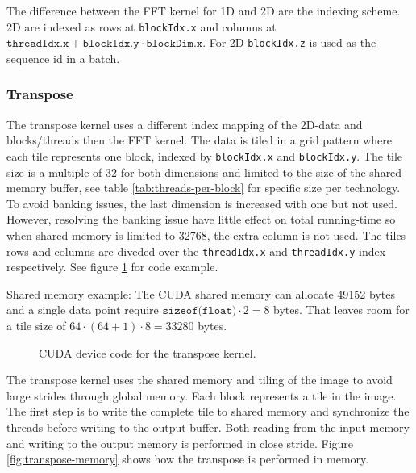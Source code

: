 The difference between the FFT kernel for 1D and 2D are the indexing scheme. 2D are indexed as rows at \texttt{blockIdx.x} and columns at $\texttt{threadIdx.x} + \texttt{blockIdx.y} \cdot \texttt{blockDim.x}$. For 2D \texttt{blockIdx.z} is used as the sequence id in a batch.

\subsubsection{Transpose}

The transpose kernel uses a different index mapping of the 2D-data and blocks/threads then the FFT kernel. The data is tiled in a grid pattern where each tile represents one block, indexed by \texttt{blockIdx.x} and \texttt{blockIdx.y}. The tile size is a multiple of 32 for both dimensions and limited to the size of the shared memory buffer, see table \ref{tab:threads-per-block} for specific size per technology. To avoid banking issues, the last dimension is increased with one but not used. However, resolving the banking issue have little effect on total running-time so when shared memory is limited to 32768, the extra column is not used. The tiles rows and columns are diveded over the \texttt{threadIdx.x} and \texttt{threadIdx.y} index respectively. See figure \ref{lst:cuda:device-transpose} for code example.

Shared memory example: The CUDA shared memory can allocate 49152 bytes and a single data point require $\texttt{sizeof(float)} \cdot 2 = 8$ bytes. That leaves room for a tile size of $64 \cdot (64 + 1) \cdot 8 = 33280$ bytes.

\begin{figure}[h!]
	\centering
	\begin{framed}
			
	\end{framed}
	\caption{CUDA device code for the transpose kernel.}
	\label{lst:cuda:device-transpose}	
\end{figure}

The transpose kernel uses the shared memory and tiling of the image to avoid large strides through global memory. Each block represents a tile in the image. The first step is to write the complete tile to shared memory and synchronize the threads before writing to the output buffer. Both reading from the input memory and writing to the output memory is performed in close stride. Figure \ref{fig:transpose-memory} shows how the transpose is performed in memory.

